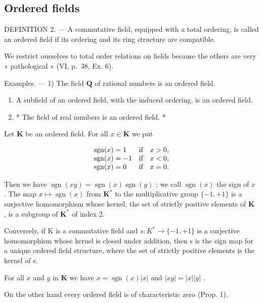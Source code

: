 \subsection{Ordered fields}

DEFINITION 2. --- A commutative field, equipped with a total ordering, is called an ordered field if its ordering and its ring structure are compatible.

We restrict ourselves to total order relations on fields because the others are very « pathological » (VI, p.~38, Ex. 6).

Examples. --- 1) The field \(\mathbf{Q}\) of rational numbers is an ordered field.

\begin{enumerate}
\def\labelenumi{\arabic{enumi})}
\setcounter{enumi}{1}
\item
  A subfield of an ordered field, with the induced ordering, is an ordered field.
\item
  * The field of real numbers is an ordered field. *
\end{enumerate}

Let \(\mathbf{K}\) be an ordered field. For all \(x\in \mathbf{K}\) we put

\[
\begin{array}{l l} \operatorname{sgn} (x) = 1 & \text {if} \quad x > 0, \\ \operatorname{sgn} (x) = - 1 & \text {if} \quad x <   0, \\ \operatorname{sgn} (x) = 0 & \text {if} \quad x = 0. \end{array}
\]

Then we have \(\operatorname{sgn}(xy) = \operatorname{sgn}(x)\operatorname{sgn}(y)\) ; we call \(\operatorname{sgn}(x)\) the sign of \(x\) . The map \(x \mapsto \operatorname{sgn}(x)\) from \(\mathbf{K}^*\) to the multiplicative group \(\{-1, +1\}\) is a surjective homomorphism whose kernel, the set of strictly positive elements of \(\mathbf{K}\) , is a subgroup of \(\mathbf{K}^*\) of index 2.

Conversely, if K is a commutative field and \(s: K^{*} \to \{-1, +1\}\) is a surjective homomorphism whose kernel is closed under addition, then s is the sign map for a unique ordered field structure, where the set of strictly positive elements is the kernel of s.

For all \(x\) and \(y\) in \(\mathbf{K}\) we have \(x = \operatorname{sgn}(x)|x|\) and \(|xy| = |x||y|\) .

On the other hand every ordered field is of characteristic zero (Prop. 1).

